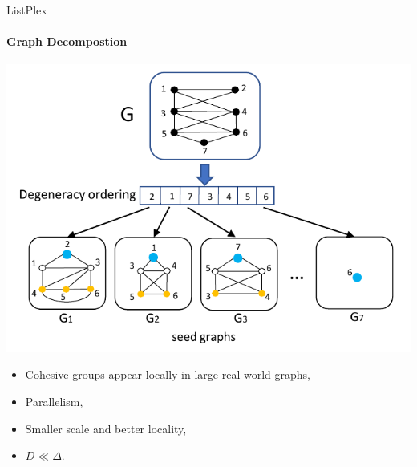 \documentclass[9pt,notheorems]{beamer} %
\begin{document}
\begin{frame}{ListPlex}
    \framesubtitle{Graph Decompostion}
    \centering
    \includegraphics[width=0.7\linewidth]{pic/degen.pdf}\\
    \begin{minipage}{0.45\linewidth}
        \begin{itemize}
            \item Cohesive groups appear locally in large real-world graphs,
            \item Parallelism,
        \end{itemize}
    \end{minipage}     
    \begin{minipage}{0.45\linewidth}
        \begin{itemize}
            \item Smaller scale and better locality,
            \item $D \ll \Delta$.
        \end{itemize}
    \end{minipage}
\end{frame}
\end{document}
